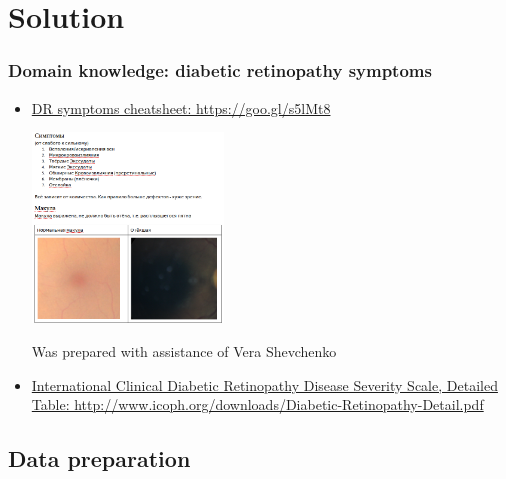 \section{Solution}

\begin{frame}\frametitle{Domain knowledge: diabetic retinopathy symptoms}

\begin{itemize}
\item {\hyperlink{https://goo.gl/s5lMt8}{DR symptoms cheatsheet: https://goo.gl/s5lMt8}
\begin{center}
\par \includegraphics[interpolate=true,valign=c,width=0.4\textwidth]{pics/symptoms_pic.png}
\end{center}
Was prepared with assistance of Vera Shevchenko
}
\item \href{http://www.icoph.org/downloads/Diabetic-Retinopathy-Detail.pdf}{International Clinical Diabetic Retinopathy Disease Severity Scale, Detailed Table: \small http://www.icoph.org/downloads/Diabetic-Retinopathy-Detail.pdf}
\end{itemize}

\end{frame}

\subsection{Data preparation}


